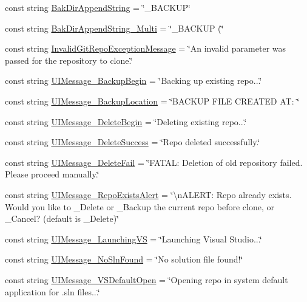 \begin{DoxyCompactItemize}
\item 
const string \mbox{\hyperlink{class_get_repo_cmdlet_1_1_const_mgr_ac59f0efc3a0397a54fd2c7c892253c56}{Bak\+Dir\+Append\+String}} = \char`\"{}\+\_\+\+B\+A\+C\+K\+UP\char`\"{}
\item 
const string \mbox{\hyperlink{class_get_repo_cmdlet_1_1_const_mgr_a951d1145e5596ce4613a38bc981f1961}{Bak\+Dir\+Append\+String\+\_\+\+Multi}} = \char`\"{}\+\_\+\+B\+A\+C\+K\+UP (\char`\"{}
\item 
const string \mbox{\hyperlink{class_get_repo_cmdlet_1_1_const_mgr_a84baefdb7fb1bcd31e0148b4ce532d8f}{Invalid\+Git\+Repo\+Exception\+Message}} = \char`\"{}An invalid parameter was passed for the repository to clone.\char`\"{}
\item 
const string \mbox{\hyperlink{class_get_repo_cmdlet_1_1_const_mgr_ace9f0289f7ef5652da94008d446f2979}{U\+I\+Message\+\_\+\+Backup\+Begin}} = \char`\"{}Backing up existing repo...\char`\"{}
\item 
const string \mbox{\hyperlink{class_get_repo_cmdlet_1_1_const_mgr_a292329a7c6d1160909785c03fcf195e5}{U\+I\+Message\+\_\+\+Backup\+Location}} = \char`\"{}B\+A\+C\+K\+UP F\+I\+LE C\+R\+E\+A\+T\+ED A\+T\+: \char`\"{}
\item 
const string \mbox{\hyperlink{class_get_repo_cmdlet_1_1_const_mgr_a5bec49a077b0e75de25519fc22ec5369}{U\+I\+Message\+\_\+\+Delete\+Begin}} = \char`\"{}Deleting existing repo...\char`\"{}
\item 
const string \mbox{\hyperlink{class_get_repo_cmdlet_1_1_const_mgr_a0d5dbe456af87b8ef8f30bf26c74c415}{U\+I\+Message\+\_\+\+Delete\+Success}} = \char`\"{}Repo deleted successfully.\char`\"{}
\item 
const string \mbox{\hyperlink{class_get_repo_cmdlet_1_1_const_mgr_a1b33b40360f7f9fea5d7cf4e5e1da7f6}{U\+I\+Message\+\_\+\+Delete\+Fail}} = \char`\"{}F\+A\+T\+A\+L\+: Deletion of old repository failed. Please proceed manually.\char`\"{}
\item 
const string \mbox{\hyperlink{class_get_repo_cmdlet_1_1_const_mgr_af23b1d641e7d9262b956b7240a974ada}{U\+I\+Message\+\_\+\+Repo\+Exists\+Alert}} = \char`\"{}\textbackslash{}n\+A\+L\+E\+R\+T\+: Repo already exists. Would you like to \+\_\+\+Delete or \+\_\+\+Backup the current repo before clone, or \+\_\+\+Cancel? (default is \+\_\+\+Delete)\char`\"{}
\item 
const string \mbox{\hyperlink{class_get_repo_cmdlet_1_1_const_mgr_afb8f26ebbe47d45457b5102801e1976a}{U\+I\+Message\+\_\+\+Launching\+VS}} = \char`\"{}Launching Visual Studio...\char`\"{}
\item 
const string \mbox{\hyperlink{class_get_repo_cmdlet_1_1_const_mgr_a4141d4c7adb23338403989ce7ac35054}{U\+I\+Message\+\_\+\+No\+Sln\+Found}} = \char`\"{}No solution file found!\char`\"{}
\item 
const string \mbox{\hyperlink{class_get_repo_cmdlet_1_1_const_mgr_aa34c2b738dffcdbffa355f20234cea7a}{U\+I\+Message\+\_\+\+V\+S\+Default\+Open}} = \char`\"{}Opening repo in system default application for .sln files...\char`\"{}
\end{DoxyCompactItemize}
